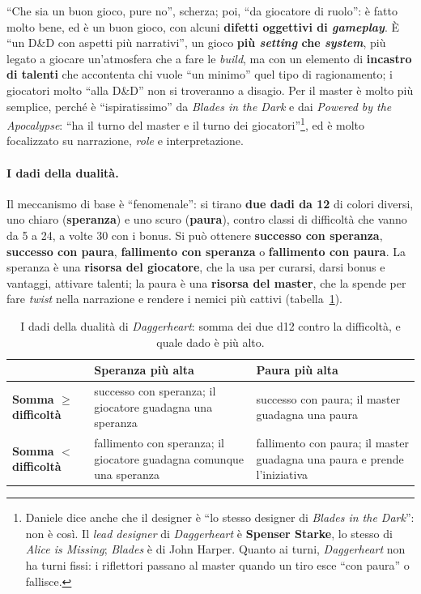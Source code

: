 ``Che sia un buon gioco, pure no'', scherza; poi, ``da giocatore di ruolo'': è fatto molto bene, ed è
un buon gioco, con alcuni \textbf{difetti oggettivi di \emph{gameplay}}. È ``un D\&D con aspetti più
narrativi'', un gioco \textbf{più \emph{setting} che \emph{system}}, più legato a giocare un'atmosfera
che a fare le \emph{build}, ma con un elemento di \textbf{incastro di talenti} che accontenta chi
vuole ``un minimo'' quel tipo di ragionamento; i giocatori molto ``alla D\&D'' non si troveranno a
disagio. Per il master è molto più semplice, perché è ``ispiratissimo'' da \emph{Blades in the Dark}
e dai \emph{Powered by the Apocalypse}: ``ha il turno del master e il turno dei
giocatori''\footnote{Daniele dice anche che il designer è ``lo stesso designer di \emph{Blades in the
Dark}'': non è così. Il \emph{lead designer} di \emph{Daggerheart} è \textbf{Spenser Starke}, lo
stesso di \emph{Alice is Missing}; \emph{Blades} è di John Harper. Quanto ai turni,
\emph{Daggerheart} non ha turni fissi: i riflettori passano al master quando un tiro esce ``con
paura'' o fallisce.}, ed è molto focalizzato su narrazione, \emph{role} e interpretazione.

\paragraph{I dadi della dualità.} Il meccanismo di base è ``fenomenale'': si tirano \textbf{due dadi
da 12} di colori diversi, uno chiaro (\textbf{speranza}) e uno scuro (\textbf{paura}), contro classi
di difficoltà che vanno da 5 a 24, a volte 30 con i bonus. Si può ottenere \textbf{successo con
speranza}, \textbf{successo con paura}, \textbf{fallimento con speranza} o \textbf{fallimento con
paura}. La speranza è una \textbf{risorsa del giocatore}, che la usa per curarsi, darsi bonus e
vantaggi, attivare talenti; la paura è una \textbf{risorsa del master}, che la spende per fare
\emph{twist} nella narrazione e rendere i nemici più cattivi (tabella~\ref{a16:tab:dualita}).

\begin{table}[htbp]
\centering
\small
\caption{I dadi della dualità di \emph{Daggerheart}: somma dei due d12 contro la difficoltà, e quale
dado è più alto.}
\label{a16:tab:dualita}
\begin{tabular}{@{}>{\raggedright\arraybackslash}p{3.2cm}>{\raggedright\arraybackslash}p{5.0cm}>{\raggedright\arraybackslash}p{5.0cm}@{}}
\toprule
& \textbf{Speranza più alta} & \textbf{Paura più alta} \\
\midrule
\textbf{Somma $\geq$ difficoltà} & successo con speranza; il giocatore guadagna una speranza &
  successo con paura; il master guadagna una paura \\
\textbf{Somma $<$ difficoltà} & fallimento con speranza; il giocatore guadagna comunque una speranza &
  fallimento con paura; il master guadagna una paura e prende l'iniziativa \\
\bottomrule
\end{tabular}
\end{table}

